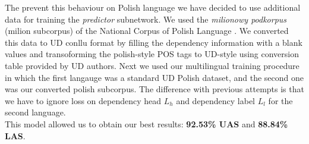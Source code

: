 The prevent this behaviour on Polish language we have decided to use additional data
for training the \emph{predictor} subnetwork. We used the \emph{milionowy podkorpus} (milion subcorpus)
of the National Corpus of Polish Language \cite{przepiorkowski_nkjp_2012}. We converted
this data to UD conllu format by filling the dependency information with a blank values
and transoforming the polish-style POS tags to UD-style using conversion table provided
by UD authors.
Next we used our multilingual training procedure in which the first langauge was
a standard UD Polish dataset, and the second one was our converted polish subcorpus.
The difference with previous attempts is that we have to ignore loss on dependency head
$L_h$ and dependency label $L_l$ for the second language.\\
This model allowed us to obtain our best results: \textbf{92.53\% UAS} and \textbf{88.84\% LAS}.
